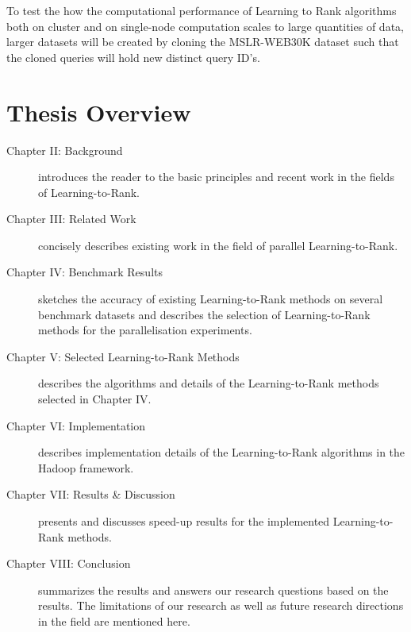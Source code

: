 To test the how the computational performance of Learning to Rank algorithms both on cluster and on single-node computation scales to large quantities of data, larger datasets will be created by cloning the MSLR-WEB30K dataset such that the cloned queries will hold new distinct query ID's.
\section{Thesis Overview}

\begin{description}
\item[Chapter II: Background]{introduces the reader to the basic principles and recent work in the fields of Learning-to-Rank.}
\item[Chapter III: Related Work]{concisely describes existing work in the field of parallel Learning-to-Rank.}
\item[Chapter IV: Benchmark Results]{sketches the accuracy of existing Learning-to-Rank methods on several benchmark datasets and describes the selection of Learning-to-Rank methods for the parallelisation experiments.}
\item[Chapter V: Selected Learning-to-Rank Methods]{describes the algorithms and details of the Learning-to-Rank methods selected in Chapter IV.}
\item[Chapter VI: Implementation]{describes implementation details of the Learning-to-Rank algorithms in the Hadoop framework.}
\item[Chapter VII: Results \& Discussion]{presents and discusses speed-up results for the implemented Learning-to-Rank methods.}
\item[Chapter VIII: Conclusion]{summarizes the results and answers our research questions based on the results. The limitations of our research as well as future research directions in the field are mentioned here.}
\end{description}